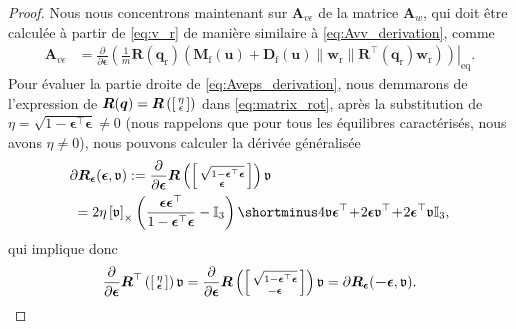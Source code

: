 \begin{proof}
Nous nous concentrons maintenant sur $\boldsymbol{A}_{v\epsilon}$ de la matrice 
$\boldsymbol{A}_{w}$,  qui doit être calculée à partir de \eqref{eq:v_r} de manière similaire à
\eqref{eq:Avv_derivation}, comme
\begin{align}
\boldsymbol{A}_{v\epsilon} &\!=\! \frac{\partial }{\partial \boldsymbol{\epsilon}}  \left. \left( \frac{1}{m} \boldsymbol{R}(\boldsymbol{q}_{\text{r}}) \left( 
\boldsymbol{M}_{\text{f}}(\boldsymbol{u}) +  
\boldsymbol{D}_{\text{f}}(\boldsymbol{u}) \lVert \boldsymbol{w}_{\text{r}} \rVert \boldsymbol{R}^\top \!(\boldsymbol{q}_{\mathrm{r}}) \boldsymbol{w}_{\text{r}}  \right) \right)\right|_{\text{eq}}.
\label{eq:Aveps_derivation}
\end{align} 
Pour évaluer la partie droite de \eqref{eq:Aveps_derivation}, nous demmarons de l'expression de $\boldsymbol{R}(\boldsymbol{q}) = \boldsymbol{R}\left( \left[ \begin{smallmatrix}\eta \\ \epsilon \end{smallmatrix} \right]\right)$ dans \eqref{eq:matrix_rot}, après la substitution de 
$\eta = \sqrt{1-\boldsymbol{\epsilon}^\top \boldsymbol{\epsilon}} \neq 0$
(nous rappelons que pour tous les équilibres caractérisés, nous avons $\eta \neq 0$), nous pouvons calculer la dérivée généralisée
\begin{align}
\label{eq:diffR_eps}
&\partial \boldsymbol{R}_{\boldsymbol{ \epsilon}} (\boldsymbol{ \epsilon},\mathfrak{v}) := \frac{\partial }{\partial \boldsymbol{\epsilon}}
\boldsymbol{R}\left(
\smallmat{\sqrt{1-\boldsymbol{\epsilon}^\top \boldsymbol{\epsilon}} \\ \boldsymbol{\epsilon}}
\right) \mathfrak{v}  \\
\nonumber
&\; = 2 \eta \skewsym{\mathfrak{v}} \left( \frac{\boldsymbol{\epsilon}\boldsymbol{\epsilon}^\top}{1-\boldsymbol{\epsilon}^\top \boldsymbol{\epsilon}} - \mathbb{I}_{3}  \right) \shortminus 4 \mathfrak{v} \boldsymbol{\epsilon}^\top \! + \!2\boldsymbol{\epsilon} \mathfrak{v}^\top \!+ \! 2\boldsymbol{\epsilon}^\top \mathfrak{v} \mathbb{I}_{3},
\end{align}
qui implique donc
\begin{align}
\label{eq:diffRtop}
    \frac{\partial }{\partial \boldsymbol{\epsilon}}
\boldsymbol{R}^\top\left(
\smallmat{\eta \\ \boldsymbol{\epsilon}}
\right) \mathfrak{v} =
    \frac{\partial }{\partial \boldsymbol{\epsilon}}
\boldsymbol{R}\left(
\smallmat{\sqrt{1-\boldsymbol{\epsilon}^\top \boldsymbol{\epsilon}} \\ -\boldsymbol{\epsilon}}
\right) \mathfrak{v} = \partial \boldsymbol{R}_{\boldsymbol{ \epsilon}} (\boldsymbol{ -\epsilon},\mathfrak{v}).

\end{align}
\end{proof}

